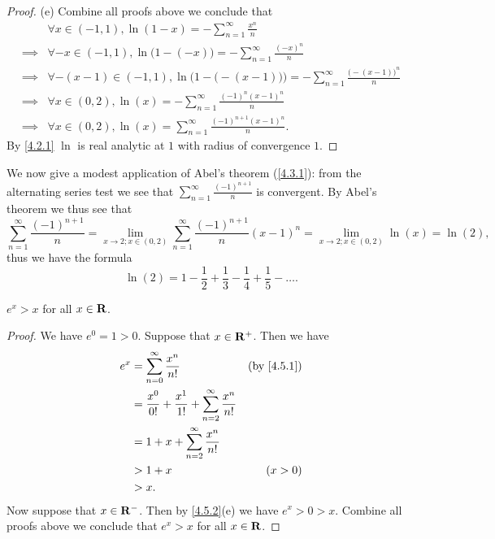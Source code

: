 \begin{proof}{(e)}
  Combine all proofs above we conclude that
  \begin{align*}
             & \forall x \in (-1, 1), \ln(1 - x) = - \sum_{n = 1}^\infty \frac{x^n}{n}                                                  \\
    \implies & \forall -x \in (-1, 1), \ln\big(1 - (-x)\big) = - \sum_{n = 1}^\infty \frac{(-x)^n}{n}                                   \\
    \implies & \forall -(x - 1) \in (-1, 1), \ln\Big(1 - \big(-(x - 1)\big)\Big) = - \sum_{n = 1}^\infty \frac{\big(-(x - 1)\big)^n}{n} \\
    \implies & \forall x \in (0, 2), \ln(x) = - \sum_{n = 1}^\infty \frac{(-1)^n (x - 1)^n}{n}                                          \\
    \implies & \forall x \in (0, 2), \ln(x) = \sum_{n = 1}^\infty \frac{(-1)^{n + 1} (x - 1)^n}{n}.
  \end{align*}
  By \cref{4.2.1} \(\ln\) is real analytic at \(1\) with radius of convergence \(1\).
\end{proof}

\begin{example}\label{4.5.7}
  We now give a modest application of Abel's theorem (\cref{4.3.1}):
  from the alternating series test we see that \(\sum_{n = 1}^\infty \frac{(-1)^{n + 1}}{n}\) is convergent.
  By Abel's theorem we thus see that
  \[
    \sum_{n = 1}^\infty \frac{(-1)^{n + 1}}{n} = \lim_{x \to 2 ; x \in (0, 2)} \sum_{n = 1}^\infty \frac{(-1)^{n + 1}}{n} (x - 1)^n = \lim_{x \to 2 ; x \in (0, 2)} \ln(x) = \ln(2),
  \]
  thus we have the formula
  \[
    \ln(2) = 1 - \frac{1}{2} + \frac{1}{3} - \frac{1}{4} +\frac{1}{5} - \dots.
  \]
\end{example}

\begin{additional corollary}\label{ac 4.5.1}
\(e^x > x\) for all \(x \in \mathbf{R}\).
\end{additional corollary}

\begin{proof}
  We have \(e^0 = 1 > 0\).
  Suppose that \(x \in \mathbf{R}^+\).
  Then we have
  \begin{align*}
    e^x & = \sum_{n = 0}^\infty \frac{x^n}{n!}                                   & \text{(by \cref{4.5.1})} \\
        & = \frac{x^0}{0!} + \frac{x^1}{1!} + \sum_{n = 2}^\infty \frac{x^n}{n!}                            \\
        & = 1 + x + \sum_{n = 2}^\infty \frac{x^n}{n!}                                                      \\
        & > 1 + x                                                                & (x > 0)                  \\
        & > x.
  \end{align*}
  Now suppose that \(x \in \mathbf{R}^-\).
  Then by \cref{4.5.2}(e) we have \(e^x > 0 > x\).
  Combine all proofs above we conclude that \(e^x > x\) for all \(x \in \mathbf{R}\).
\end{proof}

